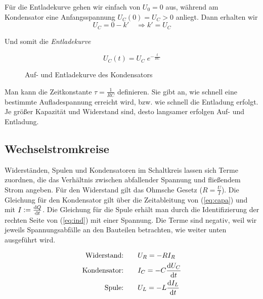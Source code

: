\documentclass[a4paper,german,12pt,smallheadings]{scrartcl}
\begin{document}
Für die Entladekurve gehen wir einfach von $U_0 = 0$ aus, während am
Kondensator eine Anfangsspannung $U_C(0) = U_C > 0$ anliegt. Dann erhalten wir
\begin{equation}
  U_C = 0 - k' \quad \Rightarrow k' = U_C
\end{equation}

Und somit die \textit{Entladekurve}

\begin{equation}
  U_C(t) = U_C \; e^{-\frac{t}{RC}}
\end{equation}

\begin{figure}[H]
  \begin{center}
    \caption{Auf- und Entladekurve des Kondensators}
  \end{center}
\end{figure}

Man kann die Zeitkonstante $\tau = \frac{1}{RC}$ definieren. Sie gibt an, wie
schnell eine bestimmte Aufladespannung erreicht wird, bzw. wie schnell die
Entladung erfolgt. Je größer Kapazität und Widerstand sind, desto langsamer
erfolgen Auf- und Entladung.

\subsection{Wechselstromkreise}

Widerständen, Spulen und Kondensatoren im Schaltkreis lassen sich Terme
zuordnen, die das Verhältnis zwischen abfallender Spannung und fließendem Strom
angeben. Für den Widerstand gilt das Ohmsche Gesetz ($R = \frac{U}{I}$).  Die
Gleichung für den Kondensator gilt über die Zeitableitung von (\ref{eq:capa})
und mit $I := \frac{\dif Q}{\dif t}$. Die Gleichung für die Spule erhält man
durch die Identifizierung der rechten Seite von (\ref{eq:ind}) mit einer
Spannung. Die Terme sind negativ, weil wir jeweils Spannungsabfälle an den
Bauteilen betrachten, wie weiter unten ausgeführt wird.

\begin{align}
  \text{Widerstand:}  \qquad & U_R = -R I_R \\
  \text{Kondensator:} \qquad & I_C = -C \frac{\dif U_C}{\dif t} \\
  \text{Spule:}       \qquad & U_L = -L \frac{\dif I_L}{\dif t}
\end{align}
\end{document}
